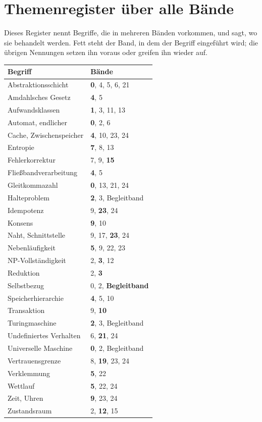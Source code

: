 \chapter{Themenregister über alle Bände}

Dieses Register nennt Begriffe, die in mehreren Bänden vorkommen, und sagt, wo sie behandelt werden. Fett steht der Band, in dem der Begriff eingeführt wird; die übrigen Nennungen setzen ihn voraus oder greifen ihn wieder auf.

\begin{merksatz}
\begin{center}
{\small
\renewcommand{\arraystretch}{1.36}
\begin{longtable}{@{}P{4.2cm}P{4.6cm}@{}}
\toprule
\textbf{Begriff} & \textbf{Bände}\\
\midrule
\endhead
Abstraktionsschicht & \textbf{0}, 4, 5, 6, 21\\
Amdahlsches Gesetz & \textbf{4}, 5\\
Aufwandsklassen & \textbf{1}, 3, 11, 13\\
Automat, endlicher & \textbf{0}, 2, 6\\
Cache, Zwischenspeicher & \textbf{4}, 10, 23, 24\\
Entropie & \textbf{7}, 8, 13\\
Fehlerkorrektur & 7, 9, \textbf{15}\\
Fließbandverarbeitung & \textbf{4}, 5\\
Gleitkommazahl & \textbf{0}, 13, 21, 24\\
Halteproblem & \textbf{2}, 3, Begleitband\\
Idempotenz & 9, \textbf{23}, 24\\
Konsens & \textbf{9}, 10\\
Naht, Schnittstelle & 9, 17, \textbf{23}, 24\\
Nebenläufigkeit & \textbf{5}, 9, 22, 23\\
NP-Vollständigkeit & 2, \textbf{3}, 12\\
Reduktion & 2, \textbf{3}\\
Selbstbezug & 0, 2, \textbf{Begleitband}\\
Speicherhierarchie & \textbf{4}, 5, 10\\
Transaktion & 9, \textbf{10}\\
Turingmaschine & \textbf{2}, 3, Begleitband\\
Undefiniertes Verhalten & 6, \textbf{21}, 24\\
Universelle Maschine & \textbf{0}, 2, Begleitband\\
Vertrauensgrenze & 8, \textbf{19}, 23, 24\\
Verklemmung & \textbf{5}, 22\\
Wettlauf & \textbf{5}, 22, 24\\
Zeit, Uhren & \textbf{9}, 23, 24\\
Zustandsraum & 2, \textbf{12}, 15\\
\bottomrule
\end{longtable}}
\end{center}
\end{merksatz}

